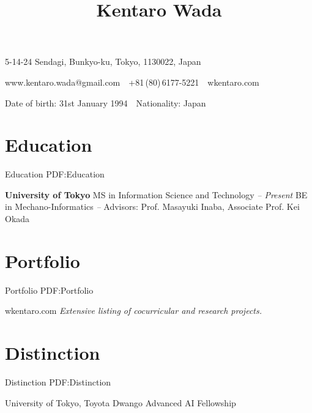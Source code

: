 \documentclass[letterpaper,MMMyyyy,nonstop]{simpleresumecv}
\newcommand{\CVAuthor}{Kentaro Wada}
\newcommand{\CVWebpage}{wkentaro.com}
\begin{document}

\title{\CVAuthor}

\begin{subtitle}
5-14-24 Sendagi, Bunkyo-ku, Tokyo, 1130022, Japan
\par
www.kentaro.wada@gmail.com
\,\SubBulletSymbol\,
+81\,(80)\,6177-5221
\,\SubBulletSymbol\,
\CVWebpage
\par
Date of birth: 31st January 1994
\,\SubBulletSymbol\,
Nationality: Japan

\noindent\makebox[\linewidth]{\rule{0.8\paperwidth}{0.4pt}}
\end{subtitle}

\begin{body}


\section
{Education}
{Education}
{PDF:Education}

\textbf{University of Tokyo}
\newline
MS in Information Science and Technology
\hfill
{\it {} -- Present}
\newline
BE in Mechano-Informatics
\hfill
{\it {} -- }
\newline
Advisors: Prof. Masayuki Inaba, Associate Prof. Kei Okada


\section
{Portfolio}
{Portfolio}
{PDF:Portfolio}

\CVWebpage
\newline
{\it Extensive listing of cocurricular and research projects.}


\section
{Distinction}
{Distinction}
{PDF:Distinction}

University of Tokyo, Toyota Dwango Advanced AI Fellowship
\hfill
{\it {}}

\BigGapNoBreak


\end{body}
\end{document}
